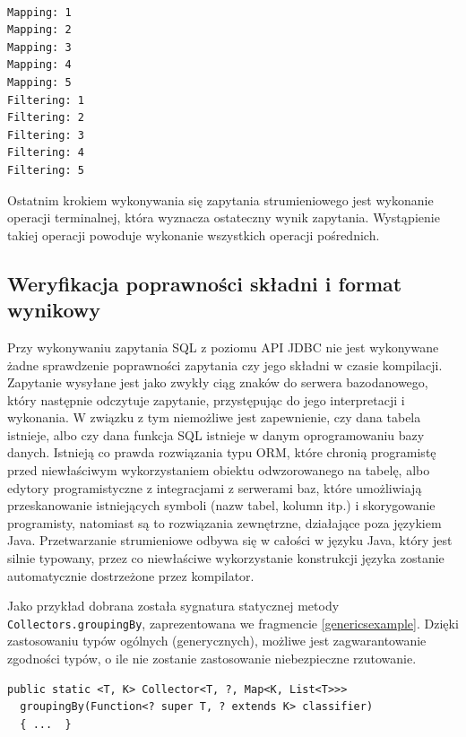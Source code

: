 \documentclass[12pt,twoside,openright]{extarticle}
\begin{document}
\begin{verbatim}

Mapping: 1
Mapping: 2
Mapping: 3
Mapping: 4
Mapping: 5
Filtering: 1
Filtering: 2
Filtering: 3
Filtering: 4
Filtering: 5

\end{verbatim}

    Ostatnim krokiem wykonywania się zapytania strumieniowego jest wykonanie operacji terminalnej, która wyznacza ostateczny wynik zapytania. Wystąpienie takiej operacji powoduje wykonanie wszystkich operacji pośrednich. 

\subsection{Weryfikacja poprawności składni i format wynikowy}

    Przy wykonywaniu zapytania SQL z poziomu API JDBC nie jest wykonywane żadne sprawdzenie poprawności zapytania czy jego składni w czasie kompilacji. Zapytanie wysyłane jest jako zwykły ciąg znaków do serwera bazodanowego, który następnie odczytuje zapytanie, przystępując do jego interpretacji i wykonania. W związku z tym niemożliwe jest zapewnienie, czy dana tabela istnieje, albo czy dana funkcja SQL istnieje w danym oprogramowaniu bazy danych. Istnieją co prawda rozwiązania typu ORM, które chronią programistę przed niewłaściwym wykorzystaniem obiektu odwzorowanego na tabelę, albo edytory programistyczne z integracjami z serwerami baz, które umożliwiają przeskanowanie istniejących symboli (nazw tabel, kolumn itp.) i skorygowanie programisty, natomiast są to rozwiązania zewnętrzne, działające poza językiem Java. Przetwarzanie strumieniowe odbywa się w całości w języku Java, który jest silnie typowany, przez co niewłaściwe wykorzystanie konstrukcji języka zostanie automatycznie dostrzeżone przez kompilator.
    
    Jako przykład dobrana została sygnatura statycznej metody \newline \texttt{Collectors.groupingBy}, zaprezentowana we fragmencie \ref{genericsexample}. Dzięki zastosowaniu typów ogólnych \cite{generics} (generycznych), możliwe jest zagwarantowanie zgodności typów, o ile nie zostanie zastosowanie niebezpieczne rzutowanie.

\begin{lstlisting}[label=genericsexample, caption=Sygnatura metody grupującej]
  public static <T, K> Collector<T, ?, Map<K, List<T>>>
  groupingBy(Function<? super T, ? extends K> classifier) 
  { ...  }
\end{lstlisting}
\end{document}

